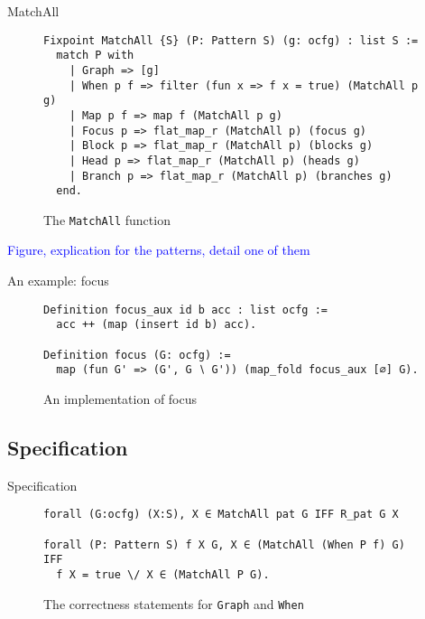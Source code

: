 \documentclass{beamer}
\newcommand{\inlinecoq}[1]{\mbox{\lstinline[style=customcoq,columns=fixed,basewidth=.48em]{#1}}}
\newcommand{\ilc}[1]{\inlinecoq{#1}}
\newcommand{\leon}[1]{\textcolor{blue}{#1}}
\begin{document}
\begin{frame}[fragile]{MatchAll}
  \begin{figure}
    \begin{lstlisting}[style=customcoq,basicstyle=\small\ttfamily]
Fixpoint MatchAll {S} (P: Pattern S) (g: ocfg) : list S :=
  match P with
    | Graph => [g]
    | When p f => filter (fun x => f x = true) (MatchAll p g) 
    | Map p f => map f (MatchAll p g)
    | Focus p => flat_map_r (MatchAll p) (focus g)
    | Block p => flat_map_r (MatchAll p) (blocks g)
    | Head p => flat_map_r (MatchAll p) (heads g)
    | Branch p => flat_map_r (MatchAll p) (branches g)
  end.
  \end{lstlisting}
    \caption{The \ilc{MatchAll} function}
    \label{fig:matchall}
  \end{figure}
  \leon{Figure, explication for the patterns, detail one of them}
\end{frame}

\begin{frame}[fragile]{An example: focus}
  \begin{figure}
    \begin{lstlisting}[style=customcoq,basicstyle=\small\ttfamily]
Definition focus_aux id b acc : list ocfg :=
  acc ++ (map (insert id b) acc).

Definition focus (G: ocfg) :=
  map (fun G' => (G', G ∖ G')) (map_fold focus_aux [∅] G).
  \end{lstlisting}
    \caption{An implementation of focus}
  \end{figure}
\end{frame}

\subsection*{Specification}

\begin{frame}[fragile]{Specification}
  \begin{figure}
    \begin{lstlisting}[style=customcoq,basicstyle=\small\ttfamily]
forall (G:ocfg) (X:S), X ∈ MatchAll pat G IFF R_pat G X

forall (P: Pattern S) f X G, X ∈ (MatchAll (When P f) G) IFF
  f X = true \/ X ∈ (MatchAll P G).
  \end{lstlisting}
    \caption{The correctness statements for \ilc{Graph} and \ilc{When}}
  \end{figure}
\end{frame}
\end{document}
